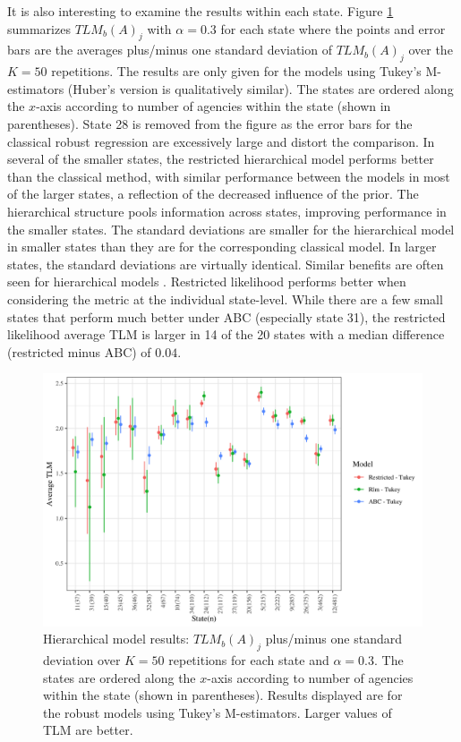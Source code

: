 \documentclass[ba]{imsart}
\begin{document}
It is also interesting to examine the results within each state. Figure \ref{fig:hierTLMstate} summarizes ${TLM}_b(A)_{j}$ with $\alpha = 0.3$ for each state where the points and error bars are the averages plus/minus one standard deviation of ${TLM}_b(A)_{j}$ over the $K = 50$ repetitions. The results are only given for the models using Tukey's M-estimators (Huber's version is qualitatively similar). The states are ordered along the $x$-axis according to number of agencies within the state (shown in parentheses). State 28 is removed from the figure as the error bars for the classical robust regression are excessively large and distort the comparison.  In several of the smaller states, the restricted hierarchical model performs better than the classical method, with similar performance between the models in most of the larger states, a reflection of the decreased influence of the prior.  The hierarchical structure pools information across states, improving performance in the smaller states. The standard deviations are smaller for the hierarchical model in smaller states than they are for the corresponding classical model.  In larger states, the standard deviations are virtually identical. Similar benefits are often seen for hierarchical models \citep[e.g.,][]{gelman2006}. 
Restricted likelihood performs better when considering the metric at the individual state-level.
While there are a few small states that perform much better under ABC (especially state 31), the restricted likelihood average TLM is larger in 14 of the 20 states with a median difference (restricted minus ABC) of $0.04$. 


 
\begin{figure}[t]
\centering
\includegraphics[width=6.8in]{hier_ave_tlm_state.png}
\caption{Hierarchical model results: ${TLM}_b(A)_{j}$  plus/minus one standard deviation over $K = 50$ repetitions for each state and $\alpha = 0.3$. The states are ordered along the $x$-axis according to number of agencies within the state (shown in parentheses). Results displayed are for the robust models using Tukey's M-estimators. Larger values of TLM are better.}
\label{fig:hierTLMstate}
\end{figure}
\end{document}
